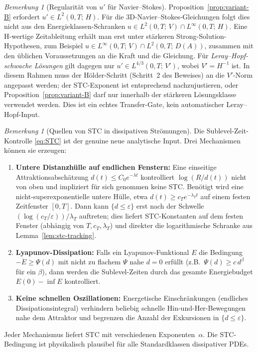 \documentclass[12pt,a4paper]{article}
\theoremstyle{definition}
\theoremstyle{plain}
\theoremstyle{remark}
\newtheorem{remark}[definition]{Bemerkung}
\begin{document}
\begin{remark}[Regularität von $u'$ für Navier--Stokes]
\label{rem:uprime-regularity}
Proposition~\ref{prop:variant-B} erfordert
$u' \in L^2(0,T;\,H)$.  Für die 3D-Navier--Stokes-Gleichungen
folgt dies nicht aus den Energieklassen-Schranken
$u \in L^2(0,T;\,V) \cap L^\infty(0,T;\,H)$.  Eine H-wertige
Zeitableitung erhält man erst unter stärkeren Strong-Solution-
Hypothesen, zum Beispiel
$u \in L^\infty(0,T;\,V)\cap L^2(0,T;\,D(A))$, zusammen mit den
üblichen Voraussetzungen an die Kraft und die Gleichung.  Für
\emph{Leray--Hopf-schwache Lösungen} gilt dagegen nur
$u' \in L^{4/3}(0,T;\,V')$, wobei $V' = H^{-1}$ ist.  In diesem
Rahmen muss der Hölder-Schritt (Schritt~2 des Beweises) an die
$V'$-Norm angepasst werden; der STC-Exponent ist entsprechend
nachzujustieren, oder Proposition~\ref{prop:variant-B} darf nur
innerhalb der stärkeren Lösungsklasse verwendet werden.  Dies ist
ein echtes Transfer-Gate, kein automatischer Leray--Hopf-Input.
\end{remark}

\begin{remark}[Quellen von STC in dissipativen Strömungen]
\label{rem:STC-sources}
Die Sublevel-Zeit-Kontrolle \eqref{eq:STC} ist der genuine neue
analytische Input.  Drei Mechanismen können sie erzeugen:

\begin{enumerate}[label=(\roman*)]
  \item \textbf{Untere Distanzhülle auf endlichen Fenstern:}\;
    Eine einseitige Attraktionsabschätzung $d(t)\le C_0 e^{-\lambda t}$
    kontrolliert $\log(R/d(t))$ nicht von oben und impliziert für sich
    genommen keine STC.  Benötigt wird eine nicht-superexponentielle
    untere Hülle, etwa $d(t)\ge c_T e^{-\lambda_T t}$ auf einem festen
    Zeitfenster $[0,T]$.  Dann kann $\{d\le\varepsilon\}$ erst nach der
    Schwelle $(\log(c_T/\varepsilon))/\lambda_T$ auftreten; dies liefert
    STC-Konstanten auf dem festen Fenster (abhängig von
    $T,c_T,\lambda_T$) und direkter die logarithmische Schranke aus
    Lemma~\ref{lem:stc-tracking}.
  \item \textbf{Lyapunov-Dissipation:}\;
    Falls ein Lyapunov-Funktional $E$ die Bedingung
    $-\dot{E} \ge \Psi(d)$ mit nicht zu flachem $\Psi$ nahe $d=0$
    erfüllt (z.B.\ $\Psi(d) \ge c\,d^\beta$ für ein $\beta$),
    dann werden die Sublevel-Zeiten durch das gesamte Energiebudget
    $E(0) - \inf E$ kontrolliert.
  \item \textbf{Keine schnellen Oszillationen:}\;
    Energetische Einschränkungen (endliches Dissipationsintegral)
    verhindern beliebig schnelle Hin-und-Her-Bewegungen nahe dem
    Attraktor und begrenzen die Anzahl der Exkursionen in
    $\{d \le \varepsilon\}$.
\end{enumerate}
Jeder Mechanismus liefert STC mit verschiedenen Exponenten~$\alpha$.
Die STC-Bedingung ist physikalisch plausibel für alle
Standardklassen dissipativer PDEs.
\end{remark}
\end{document}
